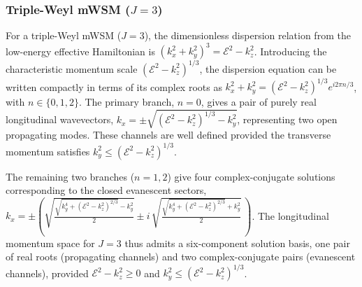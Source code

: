 \documentclass[aps,prb,onecolumn,longbibliography,nofootinbib,citeautoscript,10pt]{revtex4-2}
\begin{document}
\subsubsection{Triple-Weyl mWSM ($J=3$)} \label{subsubsec:triple_weyl_roots}

For a triple-Weyl mWSM ($J=3$), the dimensionless dispersion relation from the low-energy effective Hamiltonian is $\left(k_x^2+k_y^2\right)^3 = \mathcal{E}^2 - k_z^2$. Introducing the characteristic momentum scale $\left(\mathcal{E}^2 - k_z^2\right)^{1/3}$, the dispersion equation can be written compactly in terms of its complex roots as $k_x^2 + k_y^2 = \left(\mathcal{E}^2 - k_z^2\right)^{1/3} e^{i 2\pi n / 3}$, with $n \in \{0, 1, 2\}$. The primary branch, $n=0$, gives a pair of purely real longitudinal wavevectors, $k_x = \pm \sqrt{\left(\mathcal{E}^2 - k_z^2\right)^{1/3} - k_y^2}$, representing two open propagating modes. These channels are well defined provided the transverse momentum satisfies $k_y^2 \le \left(\mathcal{E}^2 - k_z^2\right)^{1/3}$.

The remaining two branches ($n=1,2$) give four complex-conjugate solutions corresponding to the closed evanescent sectors, $k_x = \pm \left(\sqrt{\frac{\sqrt{k_y^4 + \left(\mathcal{E}^2 - k_z^2\right)^{2/3}} - k_y^2} {2}} \pm i 
\, \sqrt{\frac{\sqrt{k_y^4 + \left(\mathcal{E}^2 - k_z^2\right)^{2/3}} + k_y^2} {2}}\,\right)$. The longitudinal momentum space for $J=3$ thus admits a six-component solution basis, one pair of real roots (propagating channels) and two complex-conjugate pairs (evanescent channels), provided $\mathcal{E}^2-k_z^2 \ge 0$ and $k_y^2 \le (\mathcal{E}^2-k_z^2)^{1/3}$.
\end{document}
